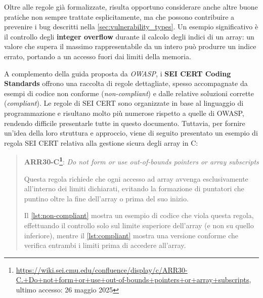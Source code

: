 Oltre alle regole già formalizzate, risulta opportuno considerare anche altre
buone pratiche non sempre trattate esplicitamente, ma che possono contribuire a prevenire
i bug descritti nella \autoref{sec:vulnerability_types}. Un esempio
significativo è il controllo degli \textbf{integer overflow} durante il calcolo degli
indici di un array: un valore che supera il massimo rappresentabile da un intero
può produrre un indice errato, portando a un accesso fuori dai limiti della memoria.

A complemento della guida proposta da \textit{OWASP}, i \textbf{SEI CERT Coding
Standards}\cite{cert_coding_standard} offrono una raccolta di regole dettagliate,
spesso accompagnate da esempi di codice non conforme (\textit{non-compliant}) e dalle
relative soluzioni corrette (\textit{compliant}). Le regole di SEI CERT sono organizzate
in base al linguaggio di programmazione e risultano molto più numerose rispetto a
quelle di OWASP, rendendo difficile presentarle tutte in questo documento. Tuttavia,
per fornire un'idea della loro struttura e approccio, viene di seguito presentato
un esempio di regola SEI CERT relativa alla gestione sicura degli array in C:

\begin{quote}
  \textbf{ARR30-C\protect\footnote{\url{https://wiki.sei.cmu.edu/confluence/display/c/ARR30-C.+Do+not+form+or+use+out-of-bounds+pointers+or+array+subscripts},
  ultimo accesso: 26 maggio 2025}}: \textit{Do not form or use out-of-bounds
  pointers or array subscripts}

  Questa regola richiede che ogni accesso ad array avvenga esclusivamente all'interno
  dei limiti dichiarati, evitando la formazione di puntatori che puntino oltre
  la fine dell'array o prima del suo inizio.

  \bigskip
  \noindent
  Il \autoref{lst:non-compliant} mostra un esempio di codice che viola questa
  regola, effettuando il controllo solo sul limite superiore dell'array (e non
  su quello inferiore), mentre il \autoref{lst:compliant} mostra una versione
  conforme che verifica entrambi i limiti prima di accedere all'array.
\end{quote}

